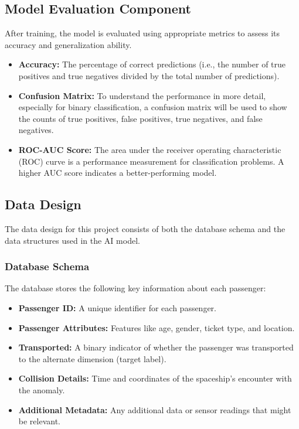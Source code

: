 \documentclass[15pt]{article}
\begin{document}
\subsection{Model Evaluation Component}

After training, the model is evaluated using appropriate metrics to assess its accuracy and generalization ability.

\begin{itemize}
    \item \textbf{Accuracy:} The percentage of correct predictions (i.e., the number of true positives and true negatives divided by the total number of predictions).
    \item \textbf{Confusion Matrix:} To understand the performance in more detail, especially for binary classification, a confusion matrix will be used to show the counts of true positives, false positives, true negatives, and false negatives.
    \item \textbf{ROC-AUC Score:} The area under the receiver operating characteristic (ROC) curve is a performance measurement for classification problems. A higher AUC score indicates a better-performing model.
\end{itemize}
\subsection{Data Design}
The data design for this project consists of both the database schema and the data structures used in the AI model.

\subsubsection{Database Schema}
The database stores the following key information about each passenger:
\begin{itemize}
    \item \textbf{Passenger ID:} A unique identifier for each passenger.
    \item \textbf{Passenger Attributes:} Features like age, gender, ticket type, and location.
    \item \textbf{Transported:} A binary indicator of whether the passenger was transported to the alternate dimension (target label).
    \item \textbf{Collision Details:} Time and coordinates of the spaceship's encounter with the anomaly.
    \item \textbf{Additional Metadata:} Any additional data or sensor readings that might be relevant.
\end{itemize}
\end{document}
